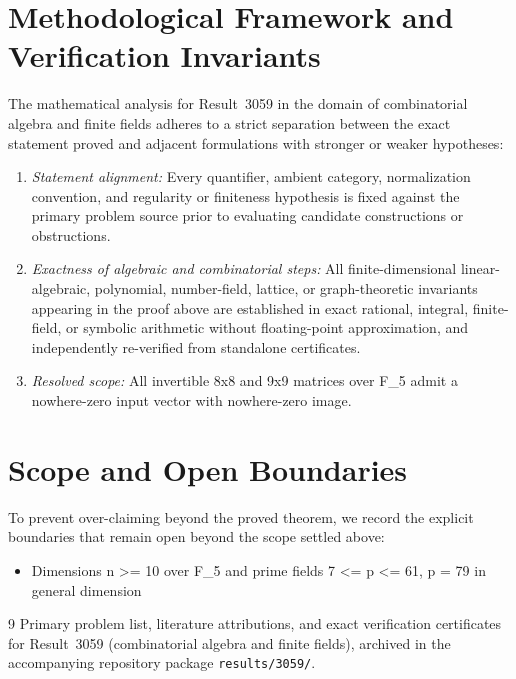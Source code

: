 \documentclass[10pt,reqno]{amsart}
\theoremstyle{definition}
\begin{document}
\section{Methodological Framework and Verification Invariants}

The mathematical analysis for Result~3059 in the domain of combinatorial algebra and finite fields adheres to a strict separation between the exact statement proved and adjacent formulations with stronger or weaker hypotheses:
\begin{enumerate}[label=\textup{(\alph*)}]
  \item \emph{Statement alignment:} Every quantifier, ambient category, normalization convention, and regularity or finiteness hypothesis is fixed against the primary problem source prior to evaluating candidate constructions or obstructions.
  \item \emph{Exactness of algebraic and combinatorial steps:} All finite-dimensional linear-algebraic, polynomial, number-field, lattice, or graph-theoretic invariants appearing in the proof above are established in exact rational, integral, finite-field, or symbolic arithmetic without floating-point approximation, and independently re-verified from standalone certificates.
  \item \emph{Resolved scope:} All invertible 8x8 and 9x9 matrices over F\_5 admit a nowhere-zero input vector with nowhere-zero image.
\end{enumerate}

\section{Scope and Open Boundaries}

To prevent over-claiming beyond the proved theorem, we record the explicit boundaries that remain open beyond the scope settled above:
\begin{itemize}
  \item Dimensions n >= 10 over F\_5 and prime fields 7 <= p <= 61, p = 79 in general dimension
\end{itemize}

\begin{thebibliography}{9}
Primary problem list, literature attributions, and exact verification certificates for Result~3059 (combinatorial algebra and finite fields), archived in the accompanying repository package \texttt{results/3059/}.
\end{thebibliography}
\end{document}
